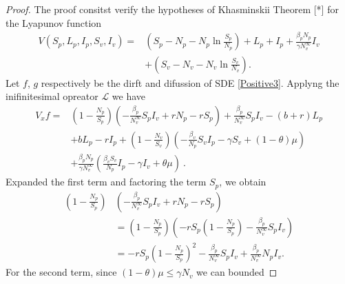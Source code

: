 \begin{proof}
	The proof consitst verify the hypotheses of Khasminskii Theorem [*] for 
	the Lyapunov function
	\begin{align*}
		V(S_p, L_p, I_p, S_v, I_v) 
			=& 
				\left(
					S_p - N_p - N_p 
					\ln 
					\frac{S_p}{N_p}
				\right) + 
				L_p + I_p + 
				\frac{\beta_p N_p}{\gamma N^\infty_v} I_v
			\\
			&+
				\left(
					S_v - N_v - N_v 
					\ln
					\frac{S_v}{N_v}
				\right).
	\end{align*}
	Let $f$, $g$ respectively be the dirft and difussion of SDE 
	\eqref{Positive3}.	
	Applyng the inifinitesimal opreator $\mathcal{L}$ we have
	\begin{equation}
		\begin{aligned}
			V_x f 
				=&
					\left(
						1 - 
						\frac{N_p}{S_p}
					\right)
					\left(
						-
						\frac{\beta_p}{N^\infty_v} S_p I_v + 
						r N_p - r S_p
					\right) + 
					\frac{\beta_p}{N^\infty_v} S_p I_v - 
					(b + r) L_p
				\\
				&+
					b L_p - r I_p + 
					\left(
						1 - 
						\frac{N_v}{S_v}
					\right)
					\left( 
						-\frac{\beta_v}{N_p} S_v I_p - 
						\gamma S_v + 
						(1 - \theta) \mu 
					\right)
				\\
				&+
					\frac{\beta_p N_p}{\gamma N ^ \infty_v}
					\left(
						\frac{\beta_v S_v}{N_p}
						I_p - \gamma I_v + 
						\theta \mu
					\right)  \ .
		\end{aligned}
	\end{equation}
	Expanded the first term and factoring the term $S_p$, we obtain
	\begin{equation}
		\label{theorem2term1}
		\begin{aligned}
			\left(
				1 - \frac{N_p}{S_p}
			\right)
			&
			\left(
				-\frac{\beta_p}{N^\infty_v} S_p I_v +
				r N_p - r S_p
			\right) 	
			\\
			&=
				\left(
						1 - \frac{N_p}{S_p}
					\right)
					\left(- r S_p 
						\left(
							1 - \frac{N_p}{S_p}
						\right) - 
						\frac{\beta_p}{N^\infty_v} S_p I_v
					\right)
			\\
			&=
				- r S_p 
				\left(
					1 - 
					\frac{N_p}{S_p}
				\right) ^ 2 - 
				\frac{\beta_p}{N ^ \infty_v} S_p I_v + 
				\frac{\beta_p}{N ^ \infty_v} N_p I_v .
		\end{aligned}
	\end{equation}
	For the second term, since $(1-\theta)\mu\leq \gamma N_v$ we can bounded 

\end{proof}
